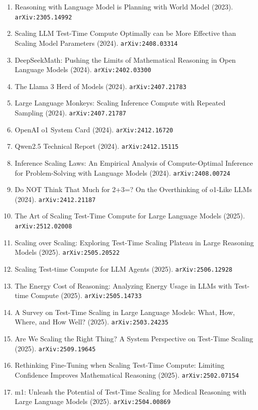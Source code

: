 \documentclass[11pt]{article}
\begin{document}
\begin{enumerate}
  Model (2023). \texttt{arXiv:2305.18290}
  \item Reasoning with Language Model is Planning with World Model (2023). \texttt{arXiv:2305.14992}
  \item Scaling LLM Test-Time Compute Optimally can be More Effective than
  Scaling Model Parameters (2024). \texttt{arXiv:2408.03314}
  \item DeepSeekMath: Pushing the Limits of Mathematical Reasoning in Open
  Language Models (2024). \texttt{arXiv:2402.03300}
  \item The Llama 3 Herd of Models (2024). \texttt{arXiv:2407.21783}
  \item Large Language Monkeys: Scaling Inference Compute with Repeated Sampling (2024). \texttt{arXiv:2407.21787}
  \item OpenAI o1 System Card (2024). \texttt{arXiv:2412.16720}
  \item Qwen2.5 Technical Report (2024). \texttt{arXiv:2412.15115}
  \item Inference Scaling Laws: An Empirical Analysis of Compute-Optimal
  Inference for Problem-Solving with Language Models (2024). \texttt{arXiv:2408.00724}
  \item Do NOT Think That Much for 2+3=? On the Overthinking of o1-Like LLMs (2024). \texttt{arXiv:2412.21187}
  \item The Art of Scaling Test-Time Compute for Large Language Models (2025). \texttt{arXiv:2512.02008}
  \item Scaling over Scaling: Exploring Test-Time Scaling Plateau in Large Reasoning Models (2025). \texttt{arXiv:2505.20522}
  \item Scaling Test-time Compute for LLM Agents (2025). \texttt{arXiv:2506.12928}
  \item The Energy Cost of Reasoning: Analyzing Energy Usage in LLMs with Test-time Compute (2025). \texttt{arXiv:2505.14733}
  \item A Survey on Test-Time Scaling in Large Language Models: What, How,
  Where, and How Well? (2025). \texttt{arXiv:2503.24235}
  \item Are We Scaling the Right Thing? A System Perspective on Test-Time Scaling (2025). \texttt{arXiv:2509.19645}
  \item Rethinking Fine-Tuning when Scaling Test-Time Compute: Limiting Confidence Improves Mathematical Reasoning (2025). \texttt{arXiv:2502.07154}
  \item m1: Unleash the Potential of Test-Time Scaling for Medical Reasoning with Large Language Models (2025). \texttt{arXiv:2504.00869}

\end{enumerate}
\end{document}
